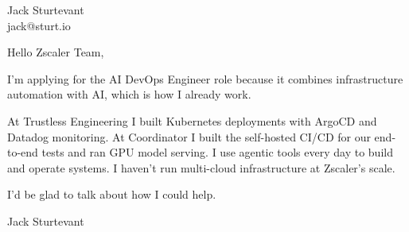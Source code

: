 \documentclass[11pt]{article}
\begin{document}
\raggedright

{\namefont\fontsize{20pt}{24pt}\selectfont Jack Sturtevant}\\[-0.3em]
jack@sturt.io

\vspace{1.2em}

Hello Zscaler Team,

I'm applying for the AI DevOps Engineer role because it combines infrastructure automation with AI, which is how I already work.

At Trustless Engineering I built Kubernetes deployments with ArgoCD and Datadog monitoring. At Coordinator I built the self-hosted CI/CD for our end-to-end tests and ran GPU model serving. I use agentic tools every day to build and operate systems. I haven't run multi-cloud infrastructure at Zscaler's scale.

I'd be glad to talk about how I could help.

\vspace{0.6em}
Jack Sturtevant
\end{document}
